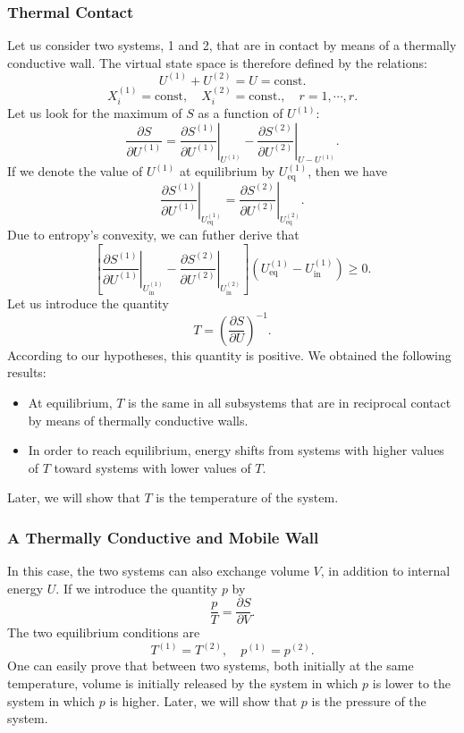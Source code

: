 \subsubsection{Thermal Contact}
Let us consider two systems, 1 and 2, that are in contact by means of a thermally conductive wall. The virtual state space is therefore defined by the relations:
\[U^{(1)} + U^{(2)} = U = \mathrm{const}.\]
\[X^{(1)}_{i} = \mathrm{const} , \quad X^{(2)}_{i} = \mathrm{const}. , \quad r = 1,\cdots,r .\]
Let us look for the maximum of $S$ as a function of $U^{(1)}$:
\[\frac{\partial S}{\partial U^{(1)}} = \left. \frac{\partial S^{(1)}}{\partial U^{(1)}} \right|_{U^{(1)}} -  \left. \frac{\partial S^{(2)}}{\partial U^{(2)}} \right|_{U-U^{(1)}}.\]
If we denote the value of $U^{(1)}$ at equilibrium by $U^{(1)}_{\mathrm{eq}}$, then we have
\[\left. \frac{\partial S^{(1)}}{\partial U^{(1)}} \right|_{U^{(1)}_{\mathrm{eq}}} =  \left. \frac{\partial S^{(2)}}{\partial U^{(2)}} \right|_{U^{(2)}_{\mathrm{eq}}}.\]
Due to entropy's convexity, we can futher derive that
\[\left[ \left. \frac{\partial S^{(1)}}{\partial U^{(1)}} \right|_{U^{(1)}_{\mathrm{in}}} -  \left. \frac{\partial S^{(2)}}{\partial U^{(2)}} \right|_{U^{(2)}_{\mathrm{in}}}\right] (U^{(1)}_{\mathrm{eq}} - U^{(1)}_{\mathrm{in}}) \geq 0.\]
Let us introduce the quantity
\[T = \left( \frac{\partial S}{\partial U} \right)^{-1}.\]
According to our hypotheses, this quantity is positive. We obtained the following results:
\begin{itemize}
\item At equilibrium, $T$ is the same in all subsystems that are in reciprocal contact by means of thermally conductive walls.
\item In order to reach equilibrium, energy shifts from systems with higher values of $T$ toward systems with lower values of $T$.
\end{itemize}
Later, we will show that $T$ is the temperature of the system.

\subsubsection{A Thermally Conductive and Mobile Wall}
In this case, the two systems can also exchange volume $V$, in addition to internal energy $U$. If we introduce the quantity $p$ by
\[\frac{p}{T} =  \frac{\partial S}{\partial V} .\]
The two equilibrium conditions are
\[T^{(1)} = T^{(2)} , \quad p^{(1)} = p^{(2)}.\]
One can easily prove that between two systems, both initially at the same temperature, volume is initially released by the system in which $p$ is lower to the system in which $p$ is higher. Later, we will show that $p$ is the pressure of the system.

